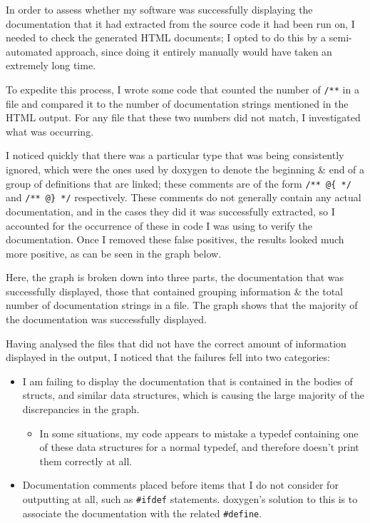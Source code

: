 In order to assess whether my software was successfully displaying the
documentation that it had extracted from the source code it had been run on, I
needed to check the generated HTML documents; I opted to do this by a
semi-automated approach, since doing it entirely manually would have taken an
extremely long time.

To expedite this process, I wrote some code that counted the number of
\lstinline|/**|
in a file and compared it to the number of documentation strings mentioned in
the HTML output. For any file that these two numbers did not match, I
investigated what was occurring.

I noticed quickly that there was a particular type that was being consistently
ignored, which were the ones used by doxygen to denote the beginning \& end of a
group of definitions that are linked; these comments are of the form
\lstinline|/** @{ */| and \lstinline|/** @} */| respectively. These comments
do not generally contain any actual documentation, and in the cases they did
it was successfully extracted, so I accounted for the occurrence of these in
code I was using to verify the documentation. Once I removed these false
positives, the results looked much more positive, as can be seen in the graph
below.

\noindent{}

Here, the graph is broken down into three parts, the documentation that was
successfully displayed, those that contained grouping information \& the total
number of documentation strings in a file. The graph shows that the majority
of the documentation was successfully displayed.

Having analysed the files that did not have the correct amount of information
displayed in the output, I noticed that the failures fell into two categories:
\begin{itemize}
  \item I am failing to display the documentation that is contained in the
    bodies of structs, and similar data structures, which is causing the large
    majority of the discrepancies in the graph.
    \begin{itemize}
      \item In some situations, my code appears to mistake a typedef
      containing one of these data structures for a normal typedef, and
      therefore doesn't print them correctly at all.
    \end{itemize}
  \item Documentation comments placed before items that I do not consider for
    outputting at all, such as \lstinline|#ifdef| statements. doxygen's
    solution to this is to associate the documentation with the related
    \lstinline|#define|.
\end{itemize}

